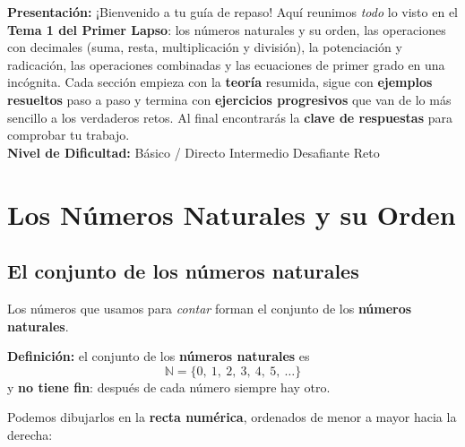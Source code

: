 \documentclass[12pt, letterpaper]{article}
\newcommand{\N}{\mathbb{N}}
\begin{document}


\vspace{4pt}
\begin{cuadroinfo}
  \small
  \textbf{Presentación:} ¡Bienvenido a tu guía de repaso! Aquí reunimos \emph{todo} lo visto en el \textbf{Tema 1 del Primer Lapso}: los números naturales y su orden, las operaciones con decimales (suma, resta, multiplicación y división), la potenciación y radicación, las operaciones combinadas y las ecuaciones de primer grado en una incógnita. Cada sección empieza con la \textbf{teoría} resumida, sigue con \textbf{ejemplos resueltos} paso a paso y termina con \textbf{ejercicios progresivos} que van de lo más sencillo a los verdaderos retos. Al final encontrarás la \textbf{clave de respuestas} para comprobar tu trabajo.
  \\[4pt]
  \textbf{Nivel de Dificultad:}\quad
  \facil{} Básico / Directo \quad
  \medio{} Intermedio \quad
  \dificil{} Desafiante \quad
  \muyDificil{} Reto
\end{cuadroinfo}

\vspace{8pt}

\section{Los Números Naturales y su Orden}

\subsection{El conjunto de los números naturales}

Los números que usamos para \emph{contar} forman el conjunto de los \textbf{números naturales}.

\begin{cuadroteoria}
  \textbf{Definición:} el conjunto de los \textbf{números naturales} es
  \[
    \N = \{0,\ 1,\ 2,\ 3,\ 4,\ 5,\ \dots\}
  \]
  y \textbf{no tiene fin}: después de cada número siempre hay otro.
\end{cuadroteoria}

\noindent Podemos dibujarlos en la \textbf{recta numérica}, ordenados de menor a mayor hacia la derecha:
\end{document}
